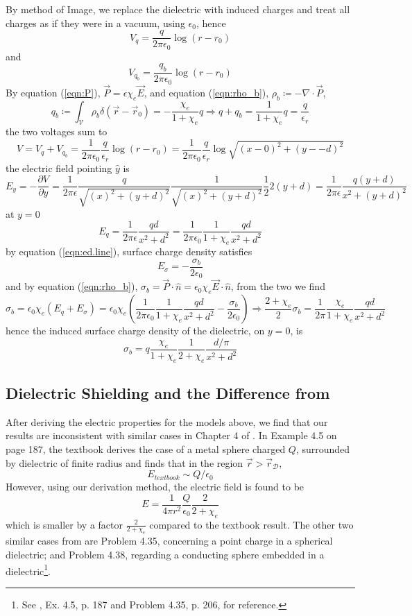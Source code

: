 By method of Image, we replace the dielectric with induced charges and treat all charges as if they were in a vacuum, using $\epsilon_0$, hence 
\[V_{q}=\frac{q}{2\pi\epsilon_0} \log(r-r_0)\]
and
\[V_{q_b}=\frac{q_b}{2\pi\epsilon_0} \log(r-r_0)\]
By equation (\ref{eqn:P}), $\vec{P}=\epsilon\chi_e \vec{E}$, and equation (\ref{eqn:rho_b}), $\rho_b\coloneqq-\nabla\cdot\vec{P}$,
\[q_b\coloneqq\int_{\mathcal{V}} \rho_b\delta (\vec{r}-\vec{r}_0)=-\frac{\chi_e}{1+\chi_e}q\Longrightarrow q+q_b=\frac{1}{1+\chi_e}q=\frac{q}{\epsilon_r}
\]
the two voltages sum to
\[
V=V_q+V_{q_b}=\frac{1}{2\pi\epsilon_0}\frac{q}{\epsilon_r}\log (r-r_0)=\frac{1}{2\pi\epsilon_0}\frac{q}{\epsilon_r}\log\sqrt{(x-0)^2+(y--d)^2}
\]
the electric field pointing $\hat{y}$ is
\[
E_y=-\frac{\partial V}{\partial y}=\frac{1}{2\pi\epsilon}\frac{q}{\sqrt{(x)^2+(y+d)^2}}\frac{1}{\sqrt{(x)^2+(y+d)^2}}\frac{1}{2}2(y+d)=\frac{1}{2\pi\epsilon}\frac{q(y+d)}{x^2+(y+d)^2}
\]
at $y=0$
\[
E_q=\frac{1}{2\pi\epsilon}\frac{qd}{x^2+d^2}=\frac{1}{2\pi\epsilon_0}\frac{1}{1+\chi_e}\frac{qd}{x^2+d^2}
\]
by equation (\ref{eqn:ed.line}), surface charge density satisfies
\[
E_\sigma=-\frac{\sigma_b}{2\epsilon_0}
\]
and by equation (\ref{eqn:rho_b}), $\sigma_b=\vec{P}\cdot\hat{n}=\epsilon_0\chi_e\vec{E}\cdot\hat{n}$, from the two we find
    \[    \sigma_b=\epsilon_0\chi_e\left(E_q+E_{\sigma}\right)=\epsilon_0\chi_e\left(\frac{1}{2\pi\epsilon_0}\frac{1}{1+\chi_e}\frac{qd}{x^2+d^2}-\frac{\sigma_b}{2\epsilon_0}\right)\Longrightarrow
        \frac{2+\chi_e}{2}\sigma_b=\frac{1}{2\pi}\frac{\chi_e}{1+\chi_e}\frac{qd}{x^2+d^2}
    \]
hence the induced surface charge density of the dielectric, on $y=0$, is
\[
\sigma_b=q\frac{\chi_e}{1+\chi_e}\frac{1}{2+\chi_e}\frac{ d / \pi}{x^2+d^2}
\]
\subsection{Dielectric Shielding and the Difference from \citeauthor{Griffiths_2017}}\label{cpt:shield}
\hspace{0em}\indent After deriving the electric properties for the models above, we find that our results are inconsistent with similar cases in Chapter 4 of \citet{Griffiths_2017}. In Example 4.5 on page 187, the textbook derives the case of a metal sphere charged $Q$, surrounded by dielectric of finite radius and finds that in the region $\vec{r}>\vec{r}_{\mathcal{D}}$,
\[E_{textbook}\sim Q/\epsilon_0\] 
However, using our derivation method, the electric field is found to be
\[E= \frac{1}{4 \pi r^2}\frac{Q}{\epsilon_0}\frac{2}{2+\chi_e}\] 
which is smaller by a factor $\frac{2}{2+\chi_e}$ compared to the textbook result. The other two similar cases from \citet{Griffiths_2017} are Problem 4.35, concerning a point charge in a spherical dielectric; and Problem 4.38, regarding a conducting sphere embedded in a dielectric\footnote{See \citet{Griffiths_2017}, Ex. 4.5, p. 187 and Problem 4.35, p. 206, for reference.}.

